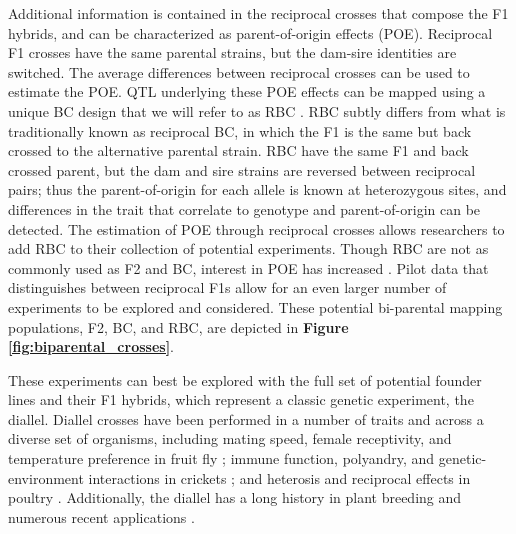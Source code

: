 Additional information is contained in the reciprocal crosses that compose the F1 hybrids, and can be characterized as parent-of-origin effects (POE). Reciprocal F1 crosses have the same parental strains, but the dam-sire identities are switched. The average differences between reciprocal crosses can be used to estimate the POE. QTL underlying these POE effects can be mapped using a unique BC design that we will refer to as RBC \citep{Gonzalo2007}. RBC subtly differs from what is traditionally known as reciprocal BC, in which the F1 is the same but back crossed to the alternative parental strain. RBC have the same F1 and back crossed parent, but the dam and sire strains are reversed between reciprocal pairs; thus the parent-of-origin for each allele is known at heterozygous sites, and differences in the trait that correlate to genotype and parent-of-origin can be detected. The estimation of POE through reciprocal crosses allows researchers to add RBC to their collection of potential experiments. Though RBC are not as commonly used as F2 and BC, interest in POE has increased \citep{Lawson2013,Berenos2014a,Connolly2014,Harper2014a,Zou2014}. Pilot data that distinguishes between reciprocal F1s allow for an even larger number of experiments to be explored and considered. These potential bi-parental mapping populations, F2, BC, and RBC, are depicted in \textbf{Figure \ref{fig:biparental_crosses}}.


These experiments can best be explored with the full set of potential founder lines and their F1 hybrids, which represent a classic genetic experiment, the diallel. Diallel crosses have been performed in a number of traits and across a diverse set of organisms, including mating speed, female receptivity, and temperature preference in fruit fly \citep{Parsons1964,Casares1992,Yamamoto1994}; immune function, polyandry, and genetic-environment interactions in crickets \citep{Rantala2006,Ivy2007,Nystrand2011}; and heterosis and reciprocal effects in poultry \citep{Emsley1983}. Additionally, the diallel has a long history in plant breeding \citep{Gilbert1958} and numerous recent applications \citep{Bahari2012,GhareebZeinab2014,DosSantos2016}. 

